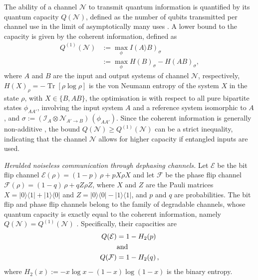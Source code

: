 \documentclass[aps,prl,twocolumn,superscriptaddress,groupedaddress]{revtex4}
\def\EQ#1{\begin{equation}\begin{aligned}#1\end{aligned}\end{equation}}
\def\>{\rangle}
\def\<{\langle}
\newcommand{\Tr}{\operatorname{Tr}}
\newcommand{\map}[1]{\mathcal{#1}}
\begin{document}
The ability of a channel $\map N$ to transmit quantum information is quantified by its quantum capacity  $Q(\map N)$, defined as the number of qubits transmitted per channel use in the limit of asymptotically many uses  \cite{Lloyd1997,Shor2002,Devetak2005}.   A lower bound to the capacity  is given by the coherent information, defined as
\EQ{
Q^{(1)}(\map N)&:=\max_\phi I(A \rangle B)_\sigma\\
&:=\max_\phi H(B)_\sigma-H(AB)_\sigma, \label{Q1}
}
where   $A$ and $B$ are the input and output systems of channel $\map N$, respectively, $H(X)_\rho=  - \Tr[ \rho \log \rho]$ is the von Neumann entropy of the system $X$ in the state $\rho$,  with $X  \in  \{  B, AB\}$,  the optimisation is with respect to all pure bipartite states $\phi_{AA'}$, involving the input system $A$ and a reference system isomorphic to $A$, and  $\sigma:=  (\map I_A \otimes \map N_{A'\to B})  \, (\phi_{AA'})$. 
Since the coherent information is generally non-additive \cite{divincenzo1998quantum}, the bound $Q (\map N)  \ge  Q^{(1)} (\map N)$ can be a strict inequality, indicating that the channel $\map N$ allows for higher capacity if  entangled inputs are used. 


{\em  Heralded noiseless communication through  dephasing channels.}   Let  $\map E$  be the bit flip channel  $\map E (\rho)   =   (1-p)\, \rho  +  p  X  \rho X$ and let $\map F$  be the phase flip channel  $\map F  ( \rho )  =   (1-q)    \, \rho +   q  Z  \rho Z$, where $X$ and $Z$ are the Pauli matrices $X =  |0\>\<1|  +  |1\>\<0|$ and $Z  =  |0\>\<0|  -  |1\>\<1|  $, and $p$ and $q$ are probabilities. 
 The bit  flip and phase flip channels belong to the 
family of  degradable channels, whose quantum capacity is exactly equal to the coherent information, namely $Q(\map N)  =  Q^{(1)}(\map N)$  \cite{Devetak2005a}. Specifically, their capacities are \cite{Wilde2013} 
\EQ{
Q(\map E)&=  1-H_2(p) \\ &{\rm and} \\    Q (\map F)    &=   1 -  H_2 (q) \, ,\label{flipCap}
}
where $H_2(x):=-x \log x-(1-x)\log (1-x)$ is the binary entropy. 
\end{document}
